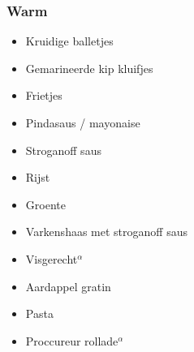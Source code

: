\subsubsection*{Warm}
\begin{itemize}
	\item	Kruidige balletjes
	\item	Gemarineerde kip kluifjes
	\item	Frietjes
	\item	Pindasaus / mayonaise
	\item	Stroganoff saus
	\item	Rijst
	\item	Groente
	\item	Varkenshaas met stroganoff saus
	\item	Visgerecht$^{\alpha}$
	\item	Aardappel gratin
	\item	Pasta
	\item	Proccureur rollade$^{\alpha}$
\end{itemize}
